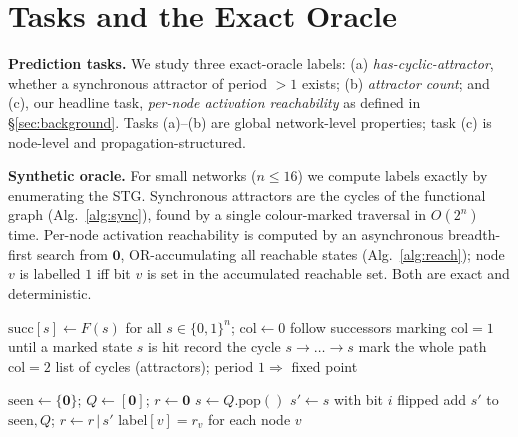 \documentclass[journal]{IEEEtran}
\newcommand{\bz}{\{0,1\}}
\begin{document}
\section{Tasks and the Exact Oracle}
\label{sec:tasks}
\textbf{Prediction tasks.} We study three exact-oracle labels: (a)
\emph{has-cyclic-attractor}, whether a synchronous attractor of period $>1$ exists; (b)
\emph{attractor count}; and (c), our headline task, \emph{per-node activation
reachability} as defined in \S\ref{sec:background}. Tasks (a)--(b) are global
network-level properties; task (c) is node-level and propagation-structured.

\textbf{Synthetic oracle.} For small networks ($n\le16$) we compute labels exactly by
enumerating the STG. Synchronous attractors are the cycles of the functional graph
(Alg.~\ref{alg:sync}), found by a single colour-marked traversal in $O(2^n)$ time.
Per-node activation reachability is computed by an asynchronous breadth-first search
from $\mathbf 0$, OR-accumulating all reachable states (Alg.~\ref{alg:reach}); node $v$
is labelled $1$ iff bit $v$ is set in the accumulated reachable set. Both are exact and
deterministic.

\begin{algorithm}[t]
\caption{Exact synchronous attractors}
\label{alg:sync}
\begin{algorithmic}[1]
\State $\mathrm{succ}[s]\gets F(s)$ for all $s\in\bz^n$; $\mathrm{col}\gets 0$
\For{$s_0\in\bz^n$ with $\mathrm{col}[s_0]=0$}
  \State follow successors marking $\mathrm{col}=1$ until a marked state $s$ is hit
   record the cycle $s\!\to\!\dots\!\to\!s$ \EndIf
  \State mark the whole path $\mathrm{col}=2$
\EndFor
\State \Return list of cycles (attractors); period $1\Rightarrow$ fixed point
\end{algorithmic}
\end{algorithm}

\begin{algorithm}[t]
\caption{Per-node activation reachability (async, from $\mathbf 0$)}
\label{alg:reach}
\begin{algorithmic}[1]
\State $\mathrm{seen}\gets\{\mathbf 0\}$; $Q\gets[\mathbf 0]$; $r\gets\mathbf 0$
  \State $s\gets Q.\mathrm{pop}()$
    \State $s'\gets s$ with bit $i$ flipped
     add $s'$ to $\mathrm{seen},Q$; $r\gets r\,|\,s'$ \EndIf
  \EndFor
\EndWhile
\State \Return label$[v]=r_v$ for each node $v$
\end{algorithmic}
\end{algorithm}
\end{document}
